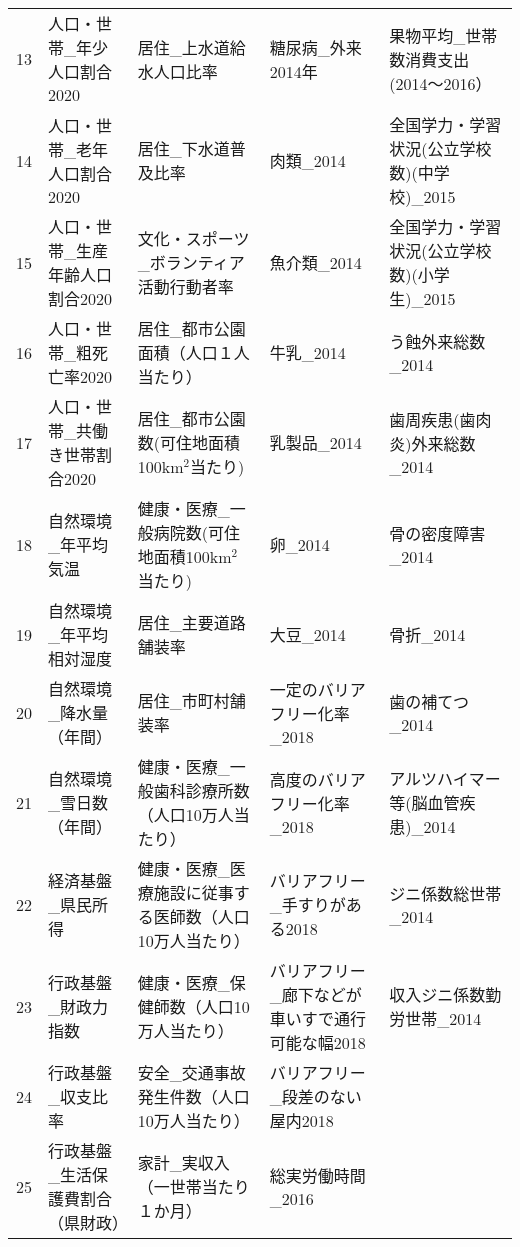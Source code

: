 \begin{table}[ht]
\begin{adjustbox}{width=.5\textwidth}
\begin{tabular}{rllll}
  13 & 人口・世帯\_年少人口割合2020 & 居住\_上水道給水人口比率 & 糖尿病\_外来2014年 & 果物平均\_世帯数消費支出(2014〜2016） \\
  14 & 人口・世帯\_老年人口割合2020 & 居住\_下水道普及比率 & 肉類\_2014 & 全国学力・学習状況(公立学校数)(中学校)\_2015 \\
  15 & 人口・世帯\_生産年齢人口割合2020 & 文化・スポーツ\_ボランティア活動行動者率 & 魚介類\_2014 & 全国学力・学習状況(公立学校数)(小学生)\_2015 \\
  16 & 人口・世帯\_粗死亡率2020 & 居住\_都市公園面積（人口１人当たり） & 牛乳\_2014 & う蝕外来総数\_2014 \\
  17 & 人口・世帯\_共働き世帯割合2020 & 居住\_都市公園数(可住地面積100km$^2$当たり) & 乳製品\_2014 & 歯周疾患(歯肉炎)外来総数\_2014 \\
  18 & 自然環境\_年平均気温 & 健康・医療\_一般病院数(可住地面積100km$^2$当たり) & 卵\_2014 & 骨の密度障害\_2014 \\
  19 & 自然環境\_年平均相対湿度 & 居住\_主要道路舗装率 & 大豆\_2014 & 骨折\_2014 \\
  20 & 自然環境\_降水量（年間） & 居住\_市町村舗装率 & 一定のバリアフリー化率\_2018 & 歯の補てつ\_2014 \\
  21 & 自然環境\_雪日数（年間） & 健康・医療\_一般歯科診療所数（人口10万人当たり） & 高度のバリアフリー化率\_2018 & アルツハイマー等(脳血管疾患)\_2014 \\
  22 & 経済基盤\_県民所得 & 健康・医療\_医療施設に従事する医師数（人口10万人当たり） & バリアフリー\_手すりがある2018 & ジニ係数総世帯\_2014 \\
  23 & 行政基盤\_財政力指数 & 健康・医療\_保健師数（人口10万人当たり） & バリアフリー\_廊下などが車いすで通行可能な幅2018 & 収入ジニ係数勤労世帯\_2014 \\
  24 & 行政基盤\_収支比率 & 安全\_交通事故発生件数（人口10万人当たり） & バリアフリー\_段差のない屋内2018 &  \\
  25 & 行政基盤\_生活保護費割合（県財政） & 家計\_実収入（一世帯当たり１か月） & 総実労働時間\_2016 &  \\
   \hline
\end{tabular}
\end{adjustbox}

\endgroup
\end{table}
